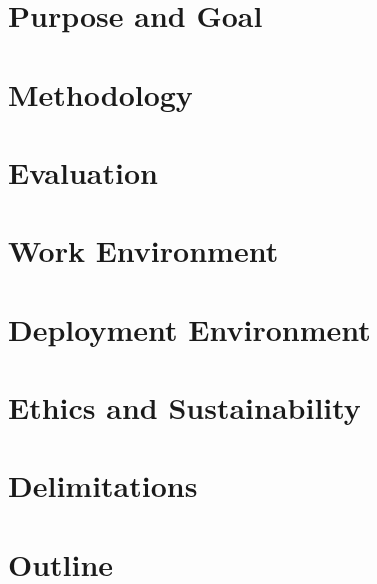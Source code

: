 \section{Purpose and Goal}
\section{Methodology}
\section{Evaluation}
\section{Work Environment}
\section{Deployment Environment}
\section{Ethics and Sustainability}
\section{Delimitations}
\section{Outline}
